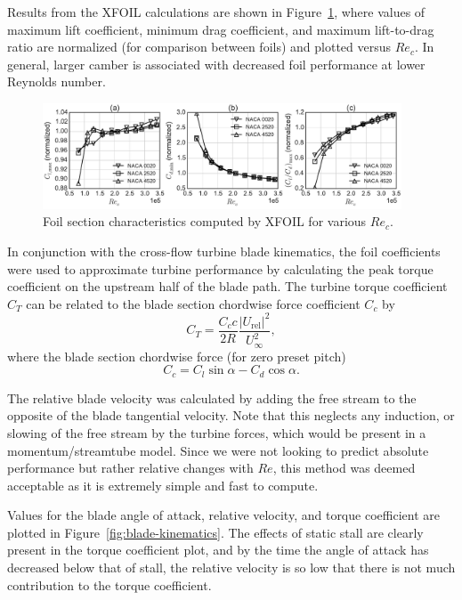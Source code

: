 \documentclass[energies,article,accept,moreauthors,pdftex,12pt,a4paper]{mdpi}
\begin{document}
Results from the XFOIL calculations are shown in Figure~\ref{fig:foil-Re-dep},
where values of maximum lift coefficient, minimum drag coefficient, and maximum
lift-to-drag ratio are normalized (for comparison between foils) and plotted
versus $Re_c$. In general, larger camber is associated with decreased foil
performance at lower Reynolds number.

\begin{figure}[ht!]
\centering
\includegraphics[width=0.95\textwidth]{figures/all_foils_re_dep}
\caption{Foil section characteristics computed by XFOIL for various $Re_c$.}
\label{fig:foil-Re-dep}
\end{figure}

In conjunction with the cross-flow turbine blade kinematics, the foil
coefficients were used to approximate turbine performance by calculating the
peak torque coefficient on the upstream half of the blade path. The turbine
torque coefficient $C_T$ can be related to the blade section chordwise force
coefficient $C_c$ by
\begin{equation}
C_T = \frac{C_c c}{2R} \frac{|U_\mathrm{rel}|^2}{U_\infty^2},
\end{equation}
where the blade section chordwise force (for zero preset pitch)
\begin{equation}
C_c = C_l \sin \alpha - C_d \cos \alpha.
\end{equation}

The relative blade velocity was calculated by adding the free stream to the
opposite of the blade tangential velocity. Note that this neglects any
induction, or slowing of the free stream by the turbine forces, which would be
present in a momentum/streamtube model. Since we were not looking to predict
absolute performance but rather relative changes with $Re$, this method was
deemed acceptable as it is extremely simple and fast to compute. 

Values for the blade angle of attack, relative velocity, and torque coefficient
are plotted in Figure~\ref{fig:blade-kinematics}. The effects of static stall
are clearly present in the torque coefficient plot, and by the time the angle of
attack has decreased below that of stall, the relative velocity is so low that
there is not much contribution to the torque coefficient.
\end{document}
